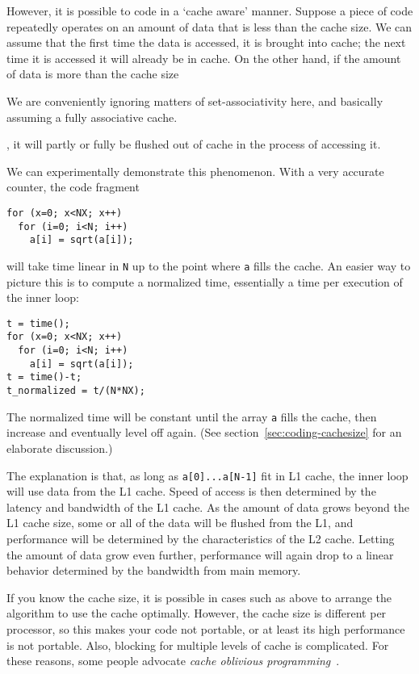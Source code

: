 However, it is possible to code in a `cache aware' manner. Suppose a
piece of code repeatedly operates on an amount of data that is less
than the cache size. We can assume that the first time the data is
accessed, it is brought into cache; the next time it is accessed it
will already be in cache. On the other hand, if the amount of data is
more than the cache size
\begin{footnoteenv}
  {We are conveniently ignoring matters
  of set-associativity here, and basically assuming a fully
  associative cache.}
\end{footnoteenv}
, it will partly or fully be flushed out of cache
in the process of accessing it.

We can experimentally demonstrate this phenomenon. With a very
accurate counter, the code fragment
\begin{lstlisting}
for (x=0; x<NX; x++)
  for (i=0; i<N; i++)
    a[i] = sqrt(a[i]);
\end{lstlisting}
will take time linear in \texttt{N} up to the point where \texttt{a}
fills the cache. An easier way to picture this is to compute a
normalized time, essentially a time per execution of the inner loop:
\begin{lstlisting}
t = time();
for (x=0; x<NX; x++)
  for (i=0; i<N; i++)
    a[i] = sqrt(a[i]);
t = time()-t;
t_normalized = t/(N*NX);
\end{lstlisting}
The normalized time will be constant until the array \texttt{a} fills
the cache, then increase and eventually level off again. (See
section~\ref{sec:coding-cachesize} for an elaborate discussion.)

The explanation is that,
as long as \texttt{a[0]...a[N-1]} fit in L1 cache, the inner loop will
use data from the L1 cache. Speed of access is then determined by the
latency and bandwidth of the L1 cache.
As the amount of data grows beyond the L1 cache size, some or all of
the data will be flushed from the L1, and performance will be determined by
the characteristics of the L2 cache. Letting the amount of data grow
even further, performance will again drop to a linear behavior
determined by the bandwidth from main memory.


If you know the cache size, it is possible in cases such as above to
arrange the algorithm to use the cache optimally. However, the cache
size is different per processor, so this makes your code not portable,
or at least its high performance is not portable. Also, blocking for
multiple levels of cache is complicated. For these reasons, some
people advocate \emph{cache oblivious
  programming}~\cite{Frigo:oblivious}. 

